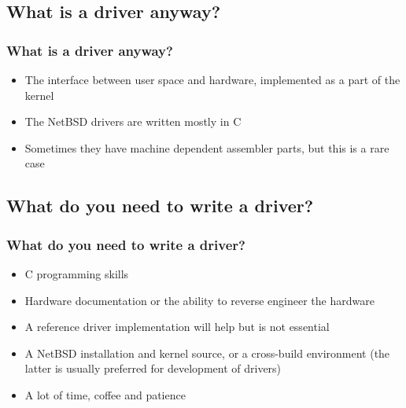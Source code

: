 \documentclass[dvipsnames,table]{beamer}
\begin{document}
\subsection{What is a driver anyway?}

\begin{frame}
\frametitle{What is a driver anyway?}
\begin{itemize}
	\item The interface between user space and hardware, implemented as a part of the kernel
	\item The NetBSD drivers are written mostly in C
	\item Sometimes they have machine dependent assembler parts, but this is a rare case
\end{itemize}
\end{frame}

\subsection{What do you need to write a driver?}

\begin{frame}
\frametitle{What do you need to write a driver?}
\begin{itemize}
	\item C programming skills
	\item Hardware documentation or the ability to reverse engineer the hardware
	\item A reference driver implementation will help but is not essential
	\item A NetBSD installation and kernel source, or a cross-build environment (the latter is usually preferred for development of drivers)
	\item A lot of time, coffee and patience {\Large \smiley}
\end{itemize}
\end{frame}
\end{document}
